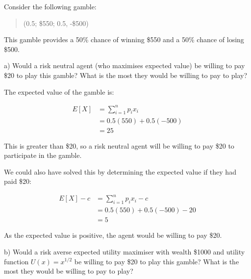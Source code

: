 \documentclass[
  letterpaper,
  DIV=11,
  numbers=noendperiod]{scrreprt}
\begin{document}
Consider the following gamble:

\begin{quote}
(0.5; \$550; 0.5, -\$500)
\end{quote}

This gamble provides a 50\% chance of winning \$550 and a 50\% chance of
losing \$500.

a) Would a risk neutral agent (who maximises expected value) be willing
to pay \$20 to play this gamble? What is the most they would be willing
to pay to play?

\begin{tcolorbox}[enhanced jigsaw, title=\textcolor{quarto-callout-tip-color}{\faLightbulb}\hspace{0.5em}{Answer}, toprule=.15mm, colback=white, breakable, titlerule=0mm, colframe=quarto-callout-tip-color-frame, coltitle=black, opacityback=0, rightrule=.15mm, colbacktitle=quarto-callout-tip-color!10!white, bottomtitle=1mm, opacitybacktitle=0.6, arc=.35mm, bottomrule=.15mm, toptitle=1mm, leftrule=.75mm, left=2mm]

The expected value of the gamble is:

\begin{align*}
E[X]&=\sum_{i=1}^n p_ix_i \\[12pt]
&=0.5(550)+0.5(-500) \\[6pt]
&=25
\end{align*}

This is greater than \$20, so a risk neutral agent will be willing to
pay \$20 to participate in the gamble.

We could also have solved this by determining the expected value if they
had paid \$20:

\begin{align*}
E[X]-c&=\sum_{i=1}^n p_ix_i-c \\[12pt]
&=0.5(550)+0.5(-500)-20 \\[6pt]
&=5
\end{align*}

As the expected value is positive, the agent would be willing to pay
\$20.

\end{tcolorbox}

b) Would a risk averse expected utility maximiser with wealth \$1000 and
utility function \(U(x)=x^{1/2}\) be willing to pay \$20 to play this
gamble? What is the most they would be willing to pay to play?
\end{document}
